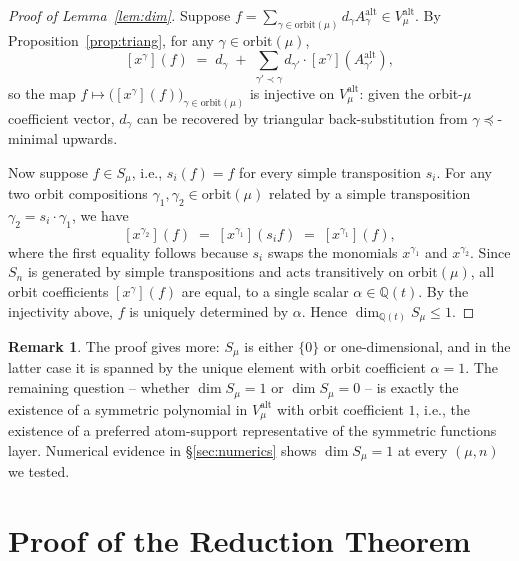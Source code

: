 \documentclass[11pt]{article}
\theoremstyle{definition}
\newtheorem{remark}[theorem]{Remark}
\newcommand{\alt}{\mathrm{alt}}
\newcommand{\orbit}{\mathrm{orbit}}
\newcommand{\QQ}{\mathbb{Q}}
\begin{document}
\begin{proof}[Proof of Lemma~\ref{lem:dim}]
Suppose $f = \sum_{\gamma\in\orbit(\mu)} d_\gamma A^\alt_\gamma\in V_\mu^\alt$.
By Proposition~\ref{prop:triang}, for any $\gamma\in\orbit(\mu)$,
\[
[x^\gamma](f) \;=\; d_\gamma \;+\; \sum_{\gamma'\prec\gamma} d_{\gamma'}\cdot [x^\gamma](A^\alt_{\gamma'}),
\]
so the map $f \mapsto \bigl([x^\gamma](f)\bigr)_{\gamma\in\orbit(\mu)}$
is injective on $V_\mu^\alt$: given the orbit-$\mu$ coefficient vector,
$d_\gamma$ can be recovered by triangular back-substitution from
$\gamma\preceq$-minimal upwards.

Now suppose $f\in S_\mu$, i.e., $s_i(f) = f$ for every simple
transposition $s_i$.  For any two orbit compositions $\gamma_1,\gamma_2
\in\orbit(\mu)$ related by a simple transposition
$\gamma_2 = s_i\cdot\gamma_1$, we have
\[
[x^{\gamma_2}](f) \;=\; [x^{\gamma_1}](s_i f) \;=\; [x^{\gamma_1}](f),
\]
where the first equality follows because $s_i$ swaps the monomials
$x^{\gamma_1}$ and $x^{\gamma_2}$.  Since $S_n$ is generated by simple
transpositions and acts transitively on $\orbit(\mu)$, all orbit
coefficients $[x^\gamma](f)$ are equal, to a single scalar
$\alpha\in\QQ(t)$.  By the injectivity above, $f$ is uniquely
determined by $\alpha$.  Hence $\dim_{\QQ(t)} S_\mu \le 1$.
\end{proof}

\begin{remark}
The proof gives more: $S_\mu$ is either $\{0\}$ or one-dimensional,
and in the latter case it is spanned by the unique element with orbit
coefficient $\alpha=1$.  The remaining question -- whether $\dim S_\mu
= 1$ or $\dim S_\mu = 0$ -- is exactly the existence of a symmetric
polynomial in $V_\mu^\alt$ with orbit coefficient $1$, i.e., the
existence of a preferred atom-support representative of the symmetric
functions layer.  Numerical evidence in \S\ref{sec:numerics} shows
$\dim S_\mu = 1$ at every $(\mu, n)$ we tested.
\end{remark}

\section{Proof of the Reduction Theorem}\label{sec:reduction}
\end{document}
